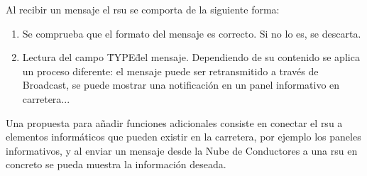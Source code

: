 Al recibir un mensaje el \gls{rsu} se comporta de la siguiente forma:
\begin{enumerate}
	\item Se comprueba que el formato del mensaje es correcto. Si no lo es, se descarta.

	\item Lectura del campo \"TYPE\" del mensaje. Dependiendo de su contenido se aplica
	un proceso diferente: el mensaje puede ser retransmitido a través de Broadcast, se
	puede mostrar una notificación en un panel informativo en carretera...
\end{enumerate}

Una propuesta para añadir funciones adicionales consiste en conectar el \gls{rsu} a
elementos informáticos que pueden existir en la carretera, por ejemplo los paneles
informativos, y al enviar un mensaje desde la Nube de Conductores a una \gls{rsu} en
concreto se pueda muestra la información deseada.
